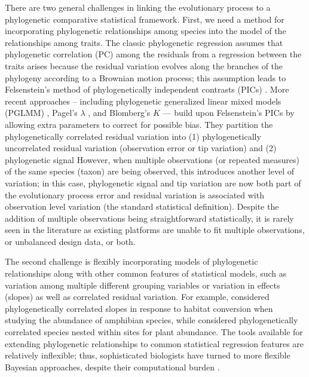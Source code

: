 There are two general challenges in linking the evolutionary process to a phylogenetic comparative statistical framework.
First, we need a method for incorporating phylogenetic relationships among species into the model of the relationships among traits.
The classic phylogenetic regression assumes that phylogenetic correlation (PC) among the residuals from a regression between the traits arises because the residual variation evolves along the branches of the phylogeny according to a Brownian motion process; this assumption leads to Felsenstein's method of phylogenetically independent contrasts (PICs) \citep{felsenstein1985phylogenies}.
More recent approaches -- including phylogenetic generalized linear mixed models (PGLMM) \citep{ives2011generalized}, Pagel's $\lambda$ \citep{pagel1999inferring}, and Blomberg's $K$ \citep{blomberg2003testing} --- build upon Felsenstein's PICs by allowing extra parameters to correct for possible bias. They partition the phylogenetically correlated residual variation into (1) phylogenetically uncorrelated residual variation (observation error or tip variation) and (2) phylogenetic signal  \citep[biological/evolutionary process error:][]{hansen2012interpreting} 
However, when multiple observations (or repeated measures) of the same species (taxon) are being observed, this introduces another level of variation; in this case, phylogenetic signal and tip variation are now both part of the evolutionary process error and residual variation is associated with observation level variation (the standard statistical definition). 
Despite the addition of multiple observations being straightforward statistically, it is rarely seen in the literature as existing platforms are unable to fit multiple observations, or unbalanced design data, or both.

The second challenge is flexibly incorporating models of phylogenetic relationships along with other common features of statistical models, such as variation among multiple different grouping variables or variation in effects (slopes) as well as correlated residual variation.
For example, \cite{nowakowski2018phylogenetic} considered phylogenetically correlated slopes in response to habitat conversion when studying the abundance of amphibian species, while \cite{li2017canfun} considered phylogenetically correlated species nested within sites for plant abundance. 
The tools available for extending phylogenetic relationships to common statistical regression features are relatively inflexible; thus, sophisticated biologists have turned to more flexible Bayesian approaches, despite their computational burden \cite{hadfield2010mcmc, burkner2016brms}.

